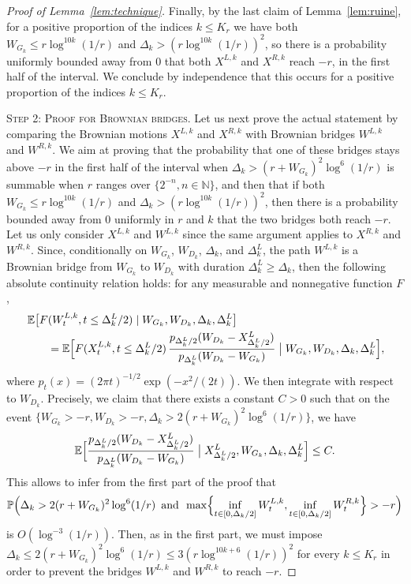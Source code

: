 \documentclass[british, a4paper,11pt]{article}
\numberwithin{equation}{section}
\theoremstyle{definition}
\renewcommand{\P}{\mathop{}\!\mathbb{P}}
\newcommand{\E}{\mathop{}\!\mathbb{E}}
\newcommand{\N}{\mathbb{N}}
\begin{document}
\begin{proof}[Proof of Lemma~\ref{lem:technique}]
Finally, by the last claim of Lemma~\ref{lem:ruine}, for a positive proportion of the indices $k \leq K_r$ we have both $W_{G_k} \leq r \log^{10k}(1/r)$ and $\Delta_k > (r \log^{10k}(1/r))^2$, so there is a probability uniformly bounded away from $0$ that both $X^{L,k}$ and $X^{R,k}$ reach $-r$, in the first half of the interval.
We conclude by independence that this occurs for a positive proportion of the indices $k \leq K_r$.
\medskip

\textsc{Step 2: Proof for Brownian bridges.}
Let us next prove the actual statement by comparing the Brownian motions $X^{L,k}$ and $X^{R,k}$ with Brownian bridges $W^{L,k}$ and $W^{R,k}$. We aim at proving that the probability that one of these bridges stays above $-r$ in the first half of the interval when $\Delta_k > (r+W_{G_k})^2 \log^6(1/r)$ is summable when $r$ ranges over $\{2^{-n}, n \in\N\}$, and then that if both $W_{G_k} \leq r \log^{10k}(1/r)$ and $\Delta_k > (r \log^{10k}(1/r))^2$, then there is a probability bounded away from $0$ uniformly in $r$ and $k$ that the two bridges both reach $-r$.
Let us only consider $X^{L,k}$ and $W^{L,k}$ since the same argument applies to $X^{R,k}$ and $W^{R,k}$.
Since, conditionally on $W_{G_k}$, $W_{D_k}$, $\Delta_k$, and $\Delta^L_k$, the path $W^{L,k}$ is a Brownian bridge from $W_{G_k}$ to $W_{D_k}$ with duration $\Delta^L_k \geq \Delta_k$, then the following absolute continuity relation holds: for any measurable and nonnegative function $F$,
\begin{align*}
&\E\bigl[F(W^{L,k}_{t}, t \leq \Delta^L_k/2) \mid W_{G_k}, W_{D_k}, \Delta_k, \Delta^L_k\bigr] \\
& \qquad = \E\Bigl[F(X^{L,k}_t, t \leq \Delta^L_k/2) \, \frac{p_{\Delta^L_k/2}(W_{D_k}-X^L_{\Delta^L_k/2})}{p_{\Delta^L_k}(W_{D_k}-W_{G_k})} \bigm| W_{G_k}, W_{D_k}, \Delta_k, \Delta^L_k\Bigr]
,
\end{align*}
where $p_t(x) = (2\pi t)^{-1/2} \exp(-x^2/(2t))$.
We then integrate with respect to $W_{D_k}$. Precisely, we claim that there exists a constant $C>0$ such that
on the event $\{W_{G_k}>-r, W_{D_k}>-r, \Delta_k > 2(r+W_{G_k})^2 \log^6(1/r)\}$, we have
\begin{equation}\label{eq:borne_ratio_technique}
\E\Bigl[\frac{p_{\Delta^L_k/2}(W_{D_k}-X^L_{\Delta^L_k/2})}{p_{\Delta^L_k}(W_{D_k}-W_{G_k})} \bigm| X^L_{\Delta^L_k/2}, W_{G_k}, \Delta_k, \Delta^L_k\Bigr]
\leq C
.\end{equation}
This allows to infer from the first part of the proof that
\[\P\Bigl(\Delta_k > 2(r+W_{G_k})^2 \log^6(1/r) \enskip\text{and}\enskip \max\Bigl\{\inf_{t \in [0,\Delta_k/2]} W^{L,k}_t, \inf_{t \in [0,\Delta_k/2]} W^{R,k}_t\Bigr\} > -r \Bigr)
\]
is $ O(\log^{-3}(1/r))$. 
Then, as in the first part, we must impose $\Delta_k \leq 2(r+W_{G_k})^2 \log^6(1/r) \leq 3(r \log^{10k+6}(1/r))^2$ for every $k \leq K_r$ in order to prevent the bridges $W^{L,k}$ and $W^{R,k}$ to reach $-r$.


\end{proof}
\end{document}
